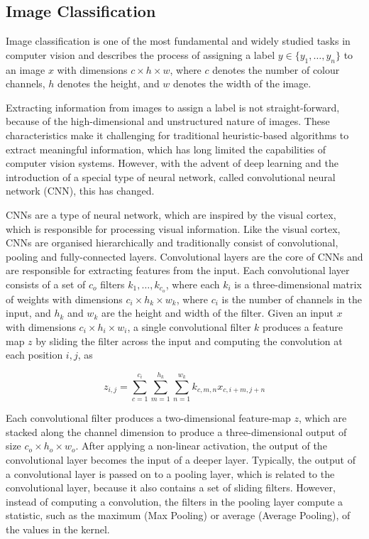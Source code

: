 \documentclass[a4paper]{article}
\begin{document}
\subsection{Image Classification}
\label{sub:image-classification}

Image classification is one of the most fundamental and widely studied tasks in
computer vision and describes the process of assigning a label $y \in \{y_1,
\ldots, y_n\}$ to an image $x$ with dimensions $c \times h \times w$, where $c$
denotes the number of colour channels, $h$ denotes the height, and $w$ denotes
the width of the image.

Extracting information from images to assign a label is not straight-forward,
because of the high-dimensional and unstructured nature of images. These
characteristics make it challenging for traditional heuristic-based algorithms
to extract meaningful information, which has long limited the capabilities of
computer vision systems. However, with the advent of deep learning and the
introduction of a special type of neural network, called convolutional neural
network (CNN), this has changed.

CNNs are a type of neural network, which are inspired by the visual cortex,
which is responsible for processing visual information. Like the visual cortex,
CNNs are organised hierarchically and traditionally consist of convolutional,
pooling and fully-connected layers. Convolutional layers are the core of CNNs
and are responsible for extracting features from the input. Each convolutional
layer consists of a set of $c_o$ filters $k_1, \ldots, k_{c_o}$, where
each $k_i$ is a three-dimensional matrix of weights with dimensions $c_i \times
h_k \times w_k$, where $c_i$ is the number of channels in the input, and $h_k$
and $w_k$ are the height and width of the filter. Given an input $x$ with
dimensions $c_i \times h_i \times w_i$, a single convolutional filter $k$
produces a feature map $z$ by sliding the filter across the input and computing
the convolution at each position ${i,j}$, as 

\[
  z_{i,j} = \sum_{c=1}^{c_i} \sum_{m=1}^{h_k} \sum_{n=1}^{w_k} 
  k_{c,m,n} x_{c,i+m,j+n}
\]

Each convolutional filter produces a two-dimensional feature-map $z$, which are
stacked along the channel dimension to produce a three-dimensional output of
size $c_o \times h_o \times w_o$. After applying a non-linear activation, the
output of the convolutional layer becomes the input of a deeper layer.
Typically, the output of a convolutional layer is passed on to a pooling layer,
which is related to the convolutional layer, because it also contains a set of
sliding filters. However, instead of computing a convolution, the filters in the
pooling layer compute a statistic, such as the maximum (Max Pooling) or average
(Average Pooling), of the values in the kernel. 
\end{document}
